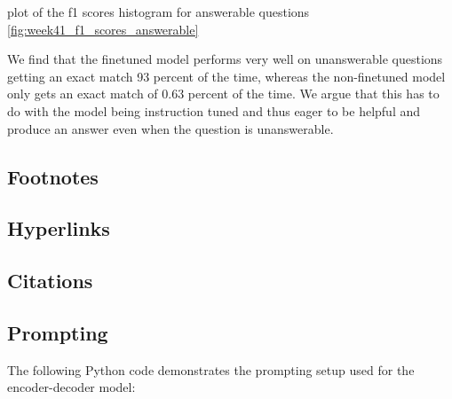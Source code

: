 \documentclass[11pt]{article}
\begin{document}

plot of the f1 scores histogram for answerable questions
\ref{fig:week41_f1_scores_answerable}


We find that the finetuned model performs very well on unanswerable questions getting an exact match 93 percent of the time, whereas the 
non-finetuned model only gets an exact match of 0.63 percent of the time. We argue that this has to do with the model being instruction tuned and 
thus eager to be helpful and produce an answer even when the question is unanswerable.


\subsection{Footnotes}

\subsection{Hyperlinks}
\subsection{Citations}


\appendix


\subsection{Prompting}
\label{sec:prompting}
The following Python code demonstrates the prompting setup used for the encoder-decoder model:
\end{document}
